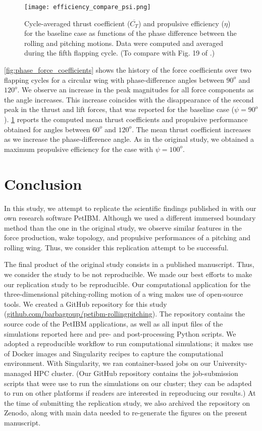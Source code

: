 \begin{figure}[!h]
  \centering
  \texttt{[image: efficiency\_compare\_psi.png]}
  \caption{Cycle-averaged thrust coefficient ($\overline{C_T}$) and propulsive efficiency ($\eta$) for the baseline case as functions of the phase difference between the rolling and pitching motions. Data were computed and averaged during the fifth flapping cycle. (To compare with Fig. 19 of \citet{li_dong_2016}.)}
  \label{fig:phase_efficiency}
\end{figure}

\cref{fig:phase_force_coefficients} shows the history of the force coefficients over two flapping cycles for a circular wing with phase-difference angles between $90^o$ and $120^o$.
We observe an increase in the peak magnitudes for all force components as the angle increases.
This increase coincides with the disappearance of the second peak in the thrust and lift forces, that was reported for the baseline case ($\psi = 90^o$).
\cref{fig:phase_efficiency} reports the computed mean thrust coefficients and propulsive performance obtained for angles between $60^o$ and $120^o$.
The mean thrust coefficient increases as we increase the phase-difference angle.
As in the original study, we obtained a maximum propulsive efficiency for the case with $\psi = 100^o$.

\section{Conclusion}

In this study, we attempt to replicate the scientific findings published in \citet{li_dong_2016} with our own research software PetIBM\supercite{chuang_et_al_2018}.
Although we used a different immersed boundary method than the one in the original study, we observe similar features in the force production, wake topology, and propulsive performances of a pitching and rolling wing.
Thus, we consider this replication attempt to be successful.

The final product of the original study consists in a published manuscript.
Thus, we consider the study to be not reproducible.
We made our best efforts to make our replication study to be reproducible.
Our computational application for the three-dimensional pitching-rolling motion of a wing makes use of open-source tools.
We created a GitHub repository for this study (\url{github.com/barbagroup/petibm-rollingpitching}).
The repository contains the source code of the PetIBM applications, as well as all input files of the simulations reported here and pre- and post-processing Python scripts.
We adopted a reproducible workflow to run computational simulations; it makes use of Docker images and Singularity recipes to capture the computational environment.
With Singularity, we ran container-based jobs on our University-managed HPC cluster.
(Our GitHub repository contains the job-submission scripts that were use to run the simulations on our cluster; they can be adapted to run on other platforms if readers are interested in reproducing our results.)
At the time of submitting the replication study, we also archived the repository on Zenodo, along with main data needed to re-generate the figures on the present manuscript.
